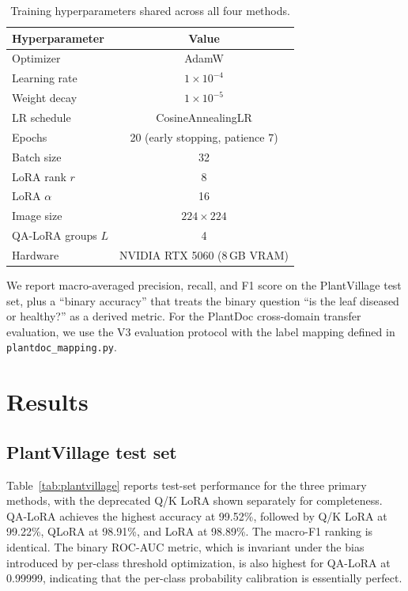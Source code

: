 \documentclass[conference]{IEEEtran}
\begin{document}
\begin{table}[htbp]
\caption{Training hyperparameters shared across all four methods.}
\begin{center}
\begin{tabular}{|l|c|}
\hline
\textbf{Hyperparameter} & \textbf{Value} \\
\hline
Optimizer & AdamW \\
Learning rate & $1 \times 10^{-4}$ \\
Weight decay & $1 \times 10^{-5}$ \\
LR schedule & CosineAnnealingLR \\
Epochs & 20 (early stopping, patience 7) \\
Batch size & 32 \\
LoRA rank $r$ & 8 \\
LoRA $\alpha$ & 16 \\
Image size & $224 \times 224$ \\
QA-LoRA groups $L$ & 4 \\
Hardware & NVIDIA RTX 5060 (8\,GB VRAM) \\
\hline
\end{tabular}
\label{tab:hparams}
\end{center}
\end{table}

We report macro-averaged precision, recall, and F1 score on the PlantVillage test set, plus a ``binary accuracy'' that treats the binary question ``is the leaf diseased or healthy?'' as a derived metric. For the PlantDoc cross-domain transfer evaluation, we use the V3 evaluation protocol with the label mapping defined in \texttt{plantdoc\_mapping.py}.

\section{Results}\label{sec:results}
\subsection{PlantVillage test set}
Table~\ref{tab:plantvillage} reports test-set performance for the three primary methods, with the deprecated Q/K LoRA shown separately for completeness. QA-LoRA achieves the highest accuracy at 99.52\%, followed by Q/K LoRA at 99.22\%, QLoRA at 98.91\%, and LoRA at 98.89\%. The macro-F1 ranking is identical. The binary ROC-AUC metric, which is invariant under the bias introduced by per-class threshold optimization, is also highest for QA-LoRA at 0.99999, indicating that the per-class probability calibration is essentially perfect.
\end{document}
